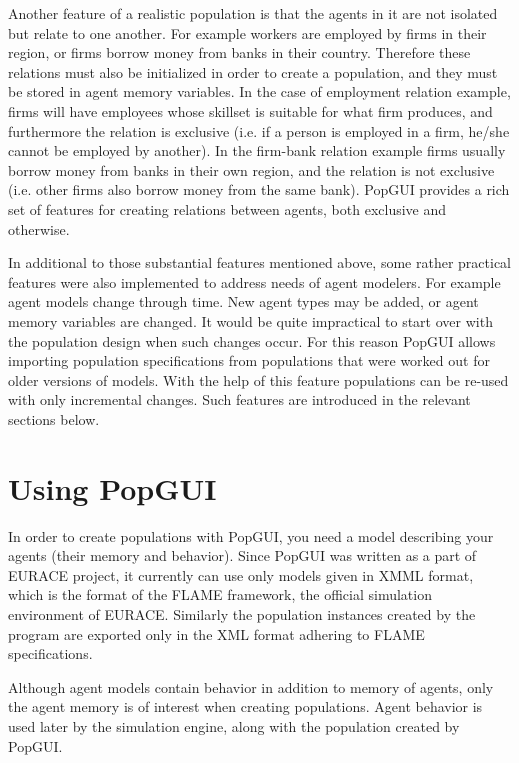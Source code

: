 Another feature of a realistic population is that the agents in it are not isolated but relate to one another. For example workers are employed by firms in their region, or firms borrow money from banks in their country. Therefore these relations must also be initialized in order to create a population, and they must be stored in agent memory variables. In the case of employment relation example, firms will have employees whose skillset is suitable for what firm produces, and furthermore the relation is exclusive (i.e. if a person is employed in a firm, he/she cannot be employed by another). In the firm-bank relation example firms usually borrow money from banks in their own region, and the relation is not exclusive (i.e. other firms also borrow money from the same bank). PopGUI provides a rich set of features for creating relations between agents, both exclusive and otherwise. 

In additional to those substantial features mentioned above, some rather practical features were also implemented to address needs of agent modelers. For example agent models change through time. New agent types may be added, or agent memory variables are changed. It would be quite impractical to start over with the population design when such changes occur. For this reason PopGUI allows importing population specifications from populations that were worked out for older versions of models. With the help of this feature populations can be re-used with only incremental changes. Such features are introduced in the relevant sections below.

\section{Using PopGUI}
In order to create populations with PopGUI, you need a model describing your agents (their memory and behavior). Since PopGUI was written as a part of EURACE project, it currently can use only  models given in XMML format, which is the format of the FLAME framework, the official simulation environment of EURACE. Similarly the population instances created by the program are exported only in the XML format adhering to FLAME specifications. 

Although agent models contain behavior in addition to memory of agents, only the agent memory is of interest when creating populations. Agent behavior is used later by the simulation engine, along with the population created by PopGUI.

